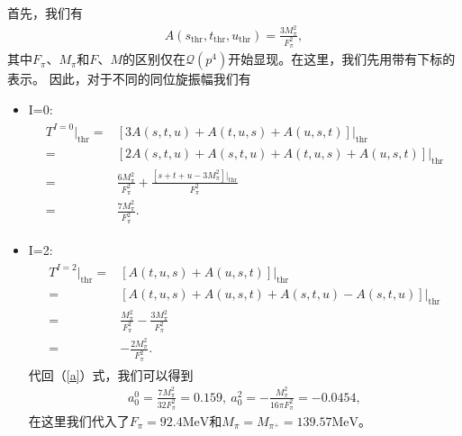 \documentclass[aps,tightenlines,16pt]{ctexart}
\numberwithin{equation}{section}
\begin{document}
首先，我们有
\begin{align}
   A(s_{\text{thr}},t_{\text{thr}},u_{\text{thr}})=\frac{3M_{\pi}^2}{F_{\pi}^2},
\end{align}
其中$F_{\pi}$、$M_{\pi}$和$F$、$M$的区别仅在$\mathcal{Q}(p^4)$开始显现。在这里，我们先用带有下标的表示。
因此，对于不同的同位旋振幅我们有
\begin{itemize}
 
\item I=0:
\begin{align}
   \begin{aligned}
   T^{I=0}|_{\text{thr}}=&[3A(s,t,u)+A(t,u,s)+A(u,s,t)]|_{\text{thr}}\\
   =&[2A(s,t,u)+A(s,t,u)+A(t,u,s)+A(u,s,t)]|_{\text{thr}}\\
   =&\frac{6M_{\pi}^2}{F_{\pi}^2}+\frac{[s+t+u-3M_{\pi}^2]|_{\text{thr}}}{F_{\pi}^2}\\
   =&\frac{7M_{\pi}^2}{F_{\pi}^2}.
   \end{aligned}
\end{align}
\item I=2:
\begin{align}
   \begin{aligned}
   T^{I=2}|_{\text{thr}}=&[A(t,u,s)+A(u,s,t)]|_{\text{thr}}\\
   =&[A(t,u,s)+A(u,s,t)+A(s,t,u)-A(s,t,u)]|_{\text{thr}}\\
   =&\frac{M_{\pi}^2}{F_{\pi}^2}-\frac{3M_{\pi}^2}{F_{\pi}^2}\\
   =&-\frac{2M_{\pi}^2}{F_{\pi}^2}.
\end{aligned}
\end{align}
代回（\ref{a}）式，我们可以得到
\begin{align}
   a_0^0=\frac{7M_{\pi}^2}{32F_{\pi}^2}=0.159,\ a_0^2 = -\frac{M_{\pi}^2}{16\pi F_{\pi}^2}=-0.0454,
\end{align}
在这里我们代入了$F_{\pi}=92.4\text{MeV}$和$M_{\pi}=M_{\pi^+}=139.57\text{MeV}$。

\end{itemize}
\end{document}
